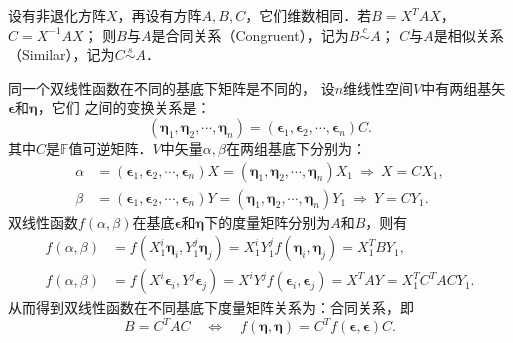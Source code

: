 \begin{definition}
    设有非退化方阵$X$，再设有方阵$A,B,C$，它们维数相同．若$B= X^T A X$，$C= X^{-1} A X$；
    则$B$与$A$是{\heiti 合同关系}（Congruent），记为$B\overset{c}{\sim} A$；
    $C$与$A$是{\heiti 相似关系}（Similar），记为$C\overset{s}{\sim} A$．    
\end{definition}


同一个双线性函数在不同的基底下矩阵是不同的，
设$n$维线性空间$V$中有两组基矢$\boldsymbol{\epsilon}$和$\boldsymbol{\eta}$，它们
之间的变换关系是：
\begin{equation}
    \left(\boldsymbol{\eta}_1,\boldsymbol{\eta}_2,\cdots,\boldsymbol{\eta}_n\right) =
    \left(\boldsymbol{\epsilon}_1,\boldsymbol{\epsilon}_2,\cdots,\boldsymbol{\epsilon}_n\right)C.
\end{equation}
其中$C$是$\mathbb{F}$值可逆矩阵．$V$中矢量$\alpha,\beta$在两组基底下分别为：
\begin{align*}
    \alpha&=\left(\boldsymbol{\epsilon}_1,\boldsymbol{\epsilon}_2,\cdots,\boldsymbol{\epsilon}_n\right)X =
    \left(\boldsymbol{\eta}_1,\boldsymbol{\eta}_2,\cdots,\boldsymbol{\eta}_n\right)X_1
    {\ \Rightarrow \  } X = C X_1 ,\\
    \beta &=\left(\boldsymbol{\epsilon}_1,\boldsymbol{\epsilon}_2,\cdots,\boldsymbol{\epsilon}_n\right)Y =
    \left(\boldsymbol{\eta}_1,\boldsymbol{\eta}_2,\cdots,\boldsymbol{\eta}_n\right)Y_1
    {\ \Rightarrow\  } Y = C Y_1 .
\end{align*}
双线性函数$f(\alpha,\beta)$在基底$\boldsymbol{\epsilon}$和$\boldsymbol{\eta}$下的度量矩阵分别为$A$和$B$，则有
\begin{align*}
    f(\alpha,\beta)  &= f\left( X_{1}^i \boldsymbol{\eta}_i, Y_{1}^j \boldsymbol{\eta}_j\right)
    = X_{1}^i Y_{1}^j f\left(  \boldsymbol{\eta}_i, \boldsymbol{\eta}_j\right) = X_1^T B Y_1,  \\
    f(\alpha,\beta)  &= f\left( X^{i} \boldsymbol{\epsilon}_i, Y^{j} \boldsymbol{\epsilon}_j\right)
    = X^{i} Y^{j} f\left(  \boldsymbol{\epsilon}_i, \boldsymbol{\epsilon}_j\right)
    = X^T A Y = X_1^T C^T A C Y_1 .
\end{align*}
从而得到双线性函数在不同基底下度量矩阵关系为：合同关系，即
\begin{equation}\label{chmla:eqn_congruent}
    B = C^T A C {\quad \Leftrightarrow \quad}
    f\left(  \boldsymbol{\eta}, \boldsymbol{\eta}\right) =
    C^T f\left(  \boldsymbol{\epsilon}, \boldsymbol{\epsilon}\right) C.
\end{equation}


